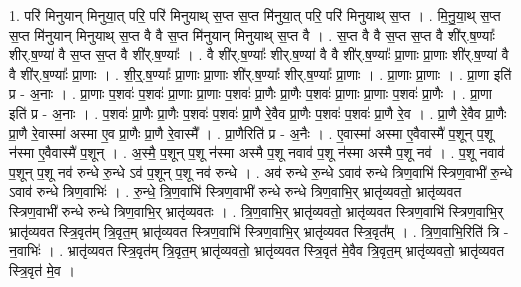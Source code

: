 \documentclass[17pt]{extarticle}
\begin{document}
1. परि॑ मिनुयान् मिनुया॒त् परि॒ परि॑ मिनुयाथ् स॒प्त स॒प्त मि॑नुया॒त् परि॒ परि॑ मिनुयाथ् स॒प्त । . मि॒नु॒या॒थ् स॒प्त स॒प्त मि॑नुयान् मिनुयाथ् स॒प्त वै वै स॒प्त मि॑नुयान् मिनुयाथ् स॒प्त वै । . स॒प्त वै वै स॒प्त स॒प्त वै शी॑र्.ष॒ण्याः᳚ शीर्.ष॒ण्या॑ वै स॒प्त स॒प्त वै शी॑र्.ष॒ण्याः᳚ । . वै शी॑र्.ष॒ण्याः᳚ शीर्.ष॒ण्या॑ वै वै शी॑र्.ष॒ण्याः᳚ प्रा॒णाः प्रा॒णाः शी॑र्.ष॒ण्या॑ वै वै शी॑र्.ष॒ण्याः᳚ प्रा॒णाः । . शी॒र्॒.ष॒ण्याः᳚ प्रा॒णाः प्रा॒णाः शी॑र्.ष॒ण्याः᳚ शीर्.ष॒ण्याः᳚ प्रा॒णाः । . प्रा॒णाः प्रा॒णाः । . प्रा॒णा इति॑ प्र - अ॒नाः । . प्रा॒णाः प॒शवः॑ प॒शवः॑ प्रा॒णाः प्रा॒णाः प॒शवः॑ प्रा॒णैः प्रा॒णैः प॒शवः॑ प्रा॒णाः प्रा॒णाः प॒शवः॑ प्रा॒णैः । . प्रा॒णा इति॑ प्र - अ॒नाः । . प॒शवः॑ प्रा॒णैः प्रा॒णैः प॒शवः॑ प॒शवः॑ प्रा॒णै रे॒वैव प्रा॒णैः प॒शवः॑ प॒शवः॑ प्रा॒णै रे॒व । . प्रा॒णै रे॒वैव प्रा॒णैः प्रा॒णै रे॒वास्मा॑ अस्मा ए॒व प्रा॒णैः प्रा॒णै रे॒वास्मै᳚ । . प्रा॒णैरिति॑ प्र - अ॒नैः । . ए॒वास्मा॑ अस्मा ए॒वैवास्मै॑ प॒शून् प॒शू न॑स्मा ए॒वैवास्मै॑ प॒शून् । . अ॒स्मै॒ प॒शून् प॒शू न॑स्मा अस्मै प॒शू नवाव॑ प॒शू न॑स्मा अस्मै प॒शू नव॑ । . प॒शू नवाव॑ प॒शून् प॒शू नव॑ रुन्धे रु॒न्धे ऽव॑ प॒शून् प॒शू नव॑ रुन्धे । . अव॑ रुन्धे रु॒न्धे ऽवाव॑ रुन्धे त्रिण॒वाभि॑ स्त्रिण॒वाभी॑ रु॒न्धे ऽवाव॑ रुन्धे त्रिण॒वाभिः॑ । . रु॒न्धे॒ त्रि॒ण॒वाभि॑ स्त्रिण॒वाभी॑ रुन्धे रुन्धे त्रिण॒वाभि॒र् भ्रातृ॑व्यवतो॒ भ्रातृ॑व्यवत स्त्रिण॒वाभी॑ रुन्धे रुन्धे त्रिण॒वाभि॒र् भ्रातृ॑व्यवतः । . त्रि॒ण॒वाभि॒र् भ्रातृ॑व्यवतो॒ भ्रातृ॑व्यवत स्त्रिण॒वाभि॑ स्त्रिण॒वाभि॒र् भ्रातृ॑व्यवत स्त्रि॒वृत॑म् त्रि॒वृत॒म् भ्रातृ॑व्यवत स्त्रिण॒वाभि॑ स्त्रिण॒वाभि॒र् भ्रातृ॑व्यवत स्त्रि॒वृत᳚म् । . त्रि॒ण॒वाभि॒रिति॑ त्रि - न॒वाभिः॑ । . भ्रातृ॑व्यवत स्त्रि॒वृत॑म् त्रि॒वृत॒म् भ्रातृ॑व्यवतो॒ भ्रातृ॑व्यवत स्त्रि॒वृत॑ मे॒वैव त्रि॒वृत॒म् भ्रातृ॑व्यवतो॒ भ्रातृ॑व्यवत स्त्रि॒वृत॑ मे॒व । \newline
\end{document}
